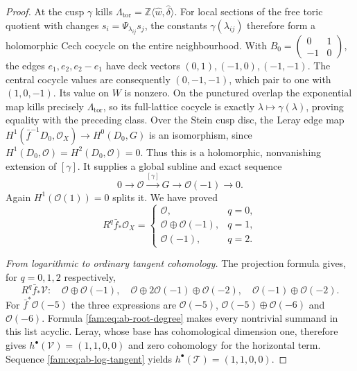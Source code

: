 \begin{proof}
At the cusp $\gamma$ kills
$\Lambda_{\mathrm{tor}}=\mathbb Z\langle\widehat w,\widehat\delta\rangle$.
For local sections of the free toric quotient with changes
$s_i=\Psi_{\lambda_{ij}}s_j$, the constants
$\gamma(\lambda_{ij})$ therefore form a holomorphic Cech cocycle
on the entire neighbourhood. With
$B_0=\left(\begin{smallmatrix}0&1\\-1&0\end{smallmatrix}\right)$,
the edges $e_1,e_2,e_2-e_1$ have deck vectors
$(0,1),(-1,0),(-1,-1)$. The central cocycle values are consequently
$(0,-1,-1)$, which pair to one with $(1,0,-1)$.
Its value on $W$ is nonzero. On the punctured overlap the exponential
map kills precisely $\Lambda_{\mathrm{tor}}$, so its full-lattice
cocycle is exactly $\lambda\mapsto\gamma(\lambda)$, proving equality
with the preceding class. Over the Stein cusp disc, the Leray edge
map $H^1(\bar f^{-1}D_0,\mathcal O_X)\to H^0(D_0,G)$ is an
isomorphism, since $H^1(D_0,\mathcal O)=H^2(D_0,\mathcal O)=0$.
Thus this is a holomorphic, nonvanishing extension of $[\gamma]$.
It supplies a global subline and exact sequence
\[
 0\longrightarrow\mathcal O\xrightarrow{[\gamma]}G
 \longrightarrow\mathcal O(-1)\longrightarrow0.
\]
Again $H^1(\mathcal O(1))=0$ splits it. We have proved
\begin{equation}\label{fam:eq:ab-direct-images}
 R^q\bar f_*\mathcal O_X=
 \begin{cases}
 \mathcal O,&q=0,\\
 \mathcal O\oplus\mathcal O(-1),&q=1,\\
 \mathcal O(-1),&q=2.
 \end{cases}
\end{equation}

\emph{From logarithmic to ordinary tangent cohomology.}
The projection formula gives, for $q=0,1,2$ respectively,
\[
 R^q\bar f_*\mathcal V:
 \quad\mathcal O\oplus\mathcal O(-1),\quad
 \mathcal O\oplus2\mathcal O(-1)\oplus\mathcal O(-2),\quad
 \mathcal O(-1)\oplus\mathcal O(-2).
\]
For $\bar f^*\mathcal O(-5)$ the three expressions are
$\mathcal O(-5)$, $\mathcal O(-5)\oplus\mathcal O(-6)$ and
$\mathcal O(-6)$. Formula \eqref{fam:eq:ab-root-degree} makes every
nontrivial summand in this list acyclic. Leray, whose base has
cohomological dimension one, therefore gives
$h^\bullet(\mathcal V)=(1,1,0,0)$ and zero cohomology for the
horizontal term. Sequence \eqref{fam:eq:ab-log-tangent} yields
$h^\bullet(\mathcal T)=(1,1,0,0)$.


\end{proof}
